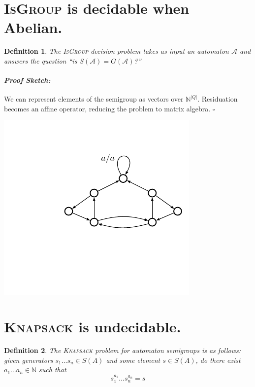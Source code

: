 \documentclass[a0]{a0poster}
\newcommand{\decprob}[1]{\textsc{#1}}
\newcommand{\N}{\mathbb{N}}
\newcommand{\A}{\mathcal{A}}
\theoremstyle{pleasant}
\newtheorem{definition}{Definition}
\newenvironment{proofsketch}{\paragraph{\large \normalfont \textit{Proof Sketch:}}}{\hfill$\square$}
\newcommand{\0}{\underline{0}}
\newcommand{\1}{\underline{1}}
\newcommand{\2}{\underline{2}}
\begin{document}
\begin{multicols}{3}
\section*{\textsc{IsGroup} is decidable when Abelian.}

\begin{definition}
  The \decprob{IsGroup} decision problem takes as input an automaton
  $\A$ and answers the question ``is $S(\A) = G(\A)$?''
\end{definition}

\begin{proofsketch} 
  We can represent elements of the semigroup as vectors over
  $\mathbb{N}^{|Q|}$. Residuation becomes an affine operator, reducing
  the problem to matrix algebra.
\end{proofsketch} 

\vspace{1em}
\begin{center}
\includegraphics[scale=1.5]{../figures/bowtie}
\end{center}
\vspace{-1em}

\section*{\textsc{Knapsack} is undecidable.}

\begin{definition}
  The \textsc{Knapsack} problem for automaton semigroups is as
  follows: given generators $s_1\ldots s_n \in S(A)$ and some element
  $s \in S(A)$, do there exist $a_1\ldots a_n \in \N$ such
  that \[s_1^{a_1}\ldots s_n^{a_n} = s \]
\end{definition}


\end{multicols}
\end{document}
